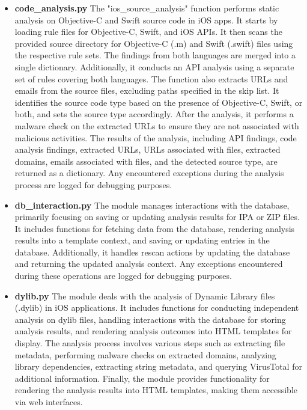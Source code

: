 \documentclass{report}
\begin{document}
\begin{itemize}
\begin{itemize}
\begin{itemize}
                    \item \textbf{code\_analysis.py}
                    The "ios\_source\_analysis" function performs static analysis on \newline Objective-C and Swift source code in iOS apps. It starts by loading rule files for Objective-C, Swift, and iOS APIs. It then scans the provided source directory for Objective-C (.m) and Swift (.swift) files using the respective rule sets. The findings from both languages are merged into a single dictionary. Additionally, it conducts an API analysis using a separate set of rules covering both languages. \newline
                    The function also extracts URLs and emails from the source files, excluding paths specified in the skip list. It identifies the source code type based on the presence of Objective-C, Swift, or both, and sets the source type accordingly.\newline
                    After the analysis, it performs a malware check on the extracted URLs to ensure they are not associated with malicious activities. The results of the analysis, including API findings, code analysis findings, extracted URLs, URLs associated with files, extracted domains, emails associated with files, and the detected source type, are returned as a dictionary. Any encountered exceptions during the analysis process are logged for debugging purposes.
                    \item \textbf{db\_interaction.py}
                    The module manages interactions with the database, primarily focusing on saving or updating analysis results for IPA or ZIP files. It includes functions for fetching data from the database, rendering analysis results into a template context, and saving or updating entries in the database. Additionally, it handles rescan actions by updating the database and returning the updated analysis context. Any exceptions encountered during these operations are logged for debugging purposes.
                    \item \textbf{dylib.py}
                    The module deals with the analysis of Dynamic Library files (.dylib) in iOS applications. It includes functions for conducting independent analysis on dylib files, handling interactions with the database for storing analysis results, and rendering analysis outcomes into HTML templates for display. The analysis process involves various steps such as extracting file metadata, performing malware checks on extracted domains, analyzing library dependencies, extracting string metadata, and querying VirusTotal for additional information. Finally, the module provides functionality for rendering the analysis results into HTML templates, making them accessible via web interfaces.

\end{itemize}
\end{itemize}
\end{itemize}
\end{document}
